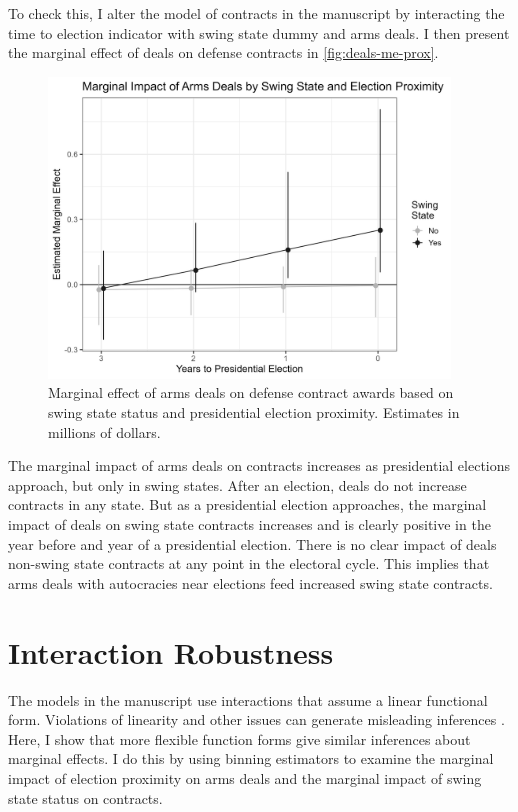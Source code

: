 \documentclass[12pt]{article}
\begin{document}
To check this, I alter the model of contracts in the manuscript by interacting the time to election indicator with swing state dummy and arms deals. 
I then present the marginal effect of deals on defense contracts in \autoref{fig:deals-me-prox}. 


\begin{figure}[htpb]
	\centering
		\includegraphics[width=0.95\textwidth]{deals-me-prox.png}
	\caption{Marginal effect of arms deals on defense contract awards based on swing state status and presidential election proximity. Estimates in millions of dollars.}
	\label{fig:deals-me-prox}
\end{figure}


The marginal impact of arms deals on contracts increases as presidential elections approach, but only in swing states. 
After an election, deals do not increase contracts in any state. 
But as a presidential election approaches, the marginal impact of deals on swing state contracts increases and is clearly positive in the year before and year of a presidential election. 
There is no clear impact of deals non-swing state contracts at any point in the electoral cycle. 
This implies that arms deals with autocracies near elections feed increased swing state contracts. 

\newpage 

\section{Interaction Robustness}

The models in the manuscript use interactions that assume a linear functional form. 
Violations of linearity and other issues can generate misleading inferences \citep{Hainmuelleretal2019}. 
Here, I show that more flexible function forms give similar inferences about marginal effects. 
I do this by using binning estimators to examine the marginal impact of election proximity on arms deals and the marginal impact of swing state status on contracts.
\end{document}
